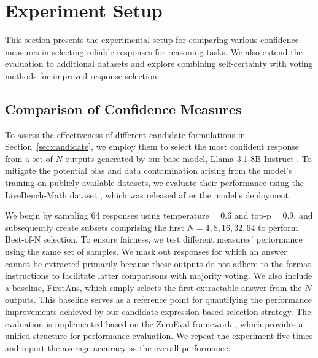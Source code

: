 \section{Experiment Setup}
This section presents the experimental setup for comparing various confidence measures in selecting reliable responses for reasoning tasks. We also extend the evaluation to additional datasets and explore combining self-certainty with voting methods for improved response selection.

\subsection{Comparison of Confidence Measures} \label{sec:experiment_setup}  
To assess the effectiveness of different candidate formulations in Section~\ref{sec:candidate}, we employ them to select the most confident response from a set of \( N \) outputs generated by our base model, Llama-3.1-8B-Instruct \cite{dubey2024llama}. To mitigate the potential bias and data contamination arising from the model's training on publicly available datasets, we evaluate their performance using the LiveBench-Math dataset \cite{white2024livebench}, which was released after the model's deployment.

We begin by sampling 64 responses using \(\text{temperature} = 0.6\) and \(\text{top-p} = 0.9\), and subsequently create subsets comprising the first \(N = 4,8,16,32,64\) to perform Best-of-N selection. To ensure fairness, we test different measures' performance using the same set of samples. We mask out responses for which an answer cannot be extracted-primarily because these outputs do not adhere to the format instructions to facilitate latter comparisons with majority voting. We also include a baseline, FirstAns, which simply selects the first extractable answer from the 
\(N\) outputs. This baseline serves as a reference point for quantifying the performance improvements achieved by our candidate expression-based selection strategy. The evaluation is implemented based on the ZeroEval framework \cite{zeroeval}, which provides a unified structure for performance evaluation. We repeat the experiment five times and report the average accuracy as the overall performance. 



